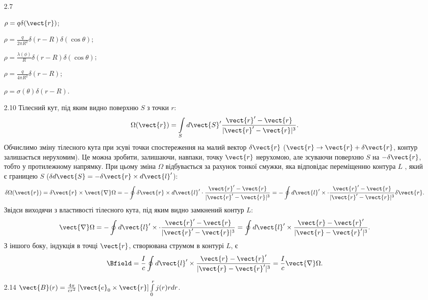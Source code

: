 \protect \section *{}
\begin{Solution}{2.{7}}
	\begin{enumerate*}[label=\alph*)]
		\item $\rho = q\delta(\vect{r})$;
		\item $\rho = \frac{q}{2\pi R^2}\delta(r - R)\delta(\cos\theta)$;
		\item $\rho = \frac{\lambda(\phi)}{R}\delta(r - R)\delta(\cos\theta)$;
		\item $\rho = \frac{q}{4\pi R^2}\delta (r - R)$;
		\item $\rho = \sigma (\theta)\delta (r - R)$.
	\end{enumerate*}
\end{Solution}
\begin{Solution}{2.{10}}
    Тілесний кут, під яким видно поверхню $S$ з точки $r$:
    \[
        \Omega(\vect{r}) = \int\limits_S d\vect{S}'\frac{\vect{r}' - \vect{r}}{|\vect{r}' - \vect{r}|^3}.
    \]
    Обчислимо зміну тілесного кута при зсуві точки спостереження на малий вектор $\delta\vect{r}$   ($\vect{r} \to \vect{r} + \delta\vect{r}$, контур залишається нерухомим). Це можна зробити, залишаючи, навпаки, точку $\vect{r}$  нерухомою, але зсуваючи поверхню $S$  на $-\delta\vect{r}$, тобто у протилежному напрямку. При цьому зміна $\Omega$ відбувається за рахунок тонкої смужки, яка відповідає переміщенню контура $L$ , який є границею $S$ ($\delta d{\vect{S}} =  - \delta\vect{r} \times d{\vect{l}'}$):
    \[
        \delta\Omega(\vect{r}) = \delta\vect{r}\times \vect{\nabla}\Omega = -\oint \delta\vect{r}\times d\vect{l}' \cdot \frac{\vect{r}' - \vect{r}}{|\vect{r}' - \vect{r}|^3} = - \oint  d\vect{l}' \times \cdot \frac{\vect{r}' - \vect{r}}{|\vect{r}' - \vect{r}|^3} \delta\vect{r}.
    \]
    Звідси виходячи з властивості тілесного кута, під яким видно замкнений контур $L$:
	\[
		\vect{\nabla}\Omega = - \oint  d\vect{l}' \times \cdot \frac{\vect{r}' - \vect{r}}{|\vect{r}' - \vect{r}|^3} = \oint  d\vect{l}' \times  \frac{\vect{r} - \vect{r}'}{|\vect{r} - \vect{r}'|^3}.
	\]
    З іншого боку, індукція в точці $\vect{r}$, створювана струмом в контурі $L$, є
	\[
		\Bfield = \frac{I}{c} \oint  d\vect{l}' \times  \frac{\vect{r} - \vect{r}'}{|\vect{r} - \vect{r}'|^3} = \frac{I}{c} \vect{\nabla}\Omega.
	\]
\end{Solution}
\begin{Solution}{2.{14}}
	$\vect{B}(r) = \frac{4\pi}{cr^2}\left[ \vect{e}_0 \times \vect{r} \right]\int\limits_0^r j(r)r dr$.
\end{Solution}
